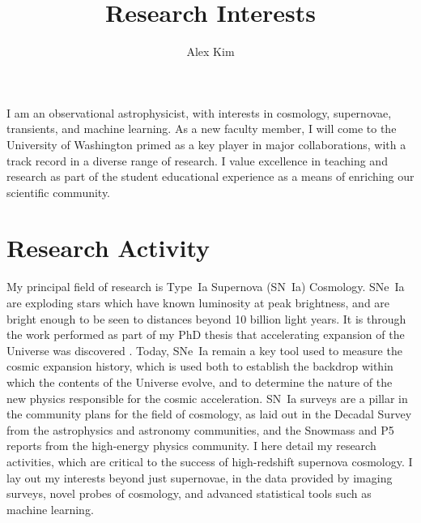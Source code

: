 \documentclass{article}
\date{}
\newcommand{\where}{University of Washington }
\newcommand{\where}{University of Michigan }
\begin{document}
\title{Research Interests}
\author{Alex Kim}
\maketitle

I am an observational astrophysicist, with interests in
cosmology, supernovae, transients, and machine learning.
As a new faculty member, I will come to the \where
primed as a key player in major collaborations, with a
track record in a diverse range of research.  I  value excellence
in teaching and research as part of the student educational experience
as a means of enriching our scientific community.

\section{Research Activity}
My principal field of research is  Type~Ia Supernova (SN~Ia) Cosmology. 
SNe~Ia are exploding stars which have known luminosity at peak brightness, and are  bright enough to be
seen to distances beyond 10 billion light years.  It is through the work
performed as part of my PhD thesis that accelerating
expansion of the Universe was discovered \cite{1997ApJ...483..565P}.  Today, SNe~Ia remain a key tool used
to measure the cosmic expansion history, which is used both to establish
the  backdrop within which the contents of the Universe evolve,
and to determine the nature of the new physics responsible
for the cosmic acceleration.
SN~Ia surveys are a pillar  in the community plans for the field of cosmology,
as laid out in
the Decadal Survey from the astrophysics and astronomy communities, and the Snowmass
\cite{2013arXiv1309.5386D,2013arXiv1309.5382K} and P5 reports
from the high-energy physics community.  I here detail my research activities,
which are critical to the success of high-redshift supernova cosmology.
I lay out my interests beyond just supernovae, in the data provided by imaging surveys,
novel probes of cosmology, and advanced statistical tools such as machine learning.
\end{document}
